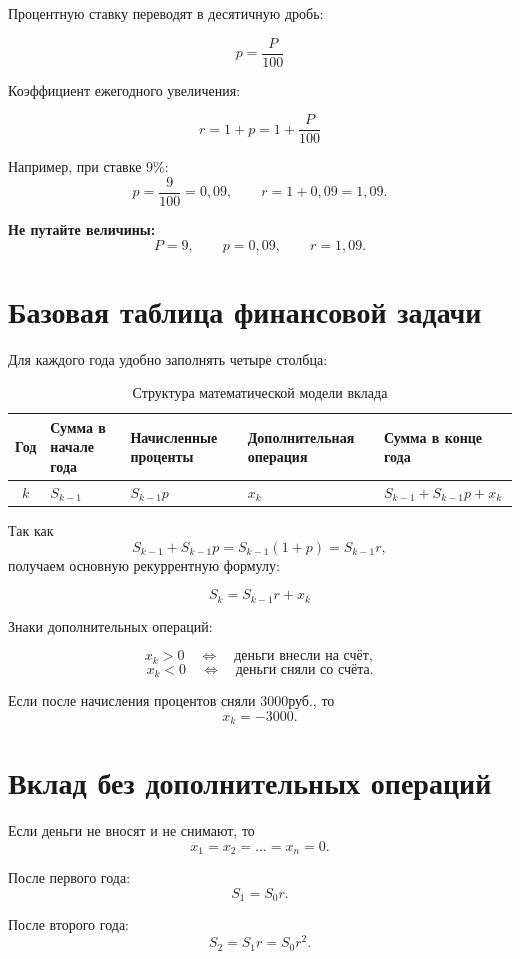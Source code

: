 \documentclass[a4paper,12pt]{article}
\newcommand{\RUB}{\text{руб.}}
\newcommand{\important}[1]{\textbf{\color{darkaccent}#1}}
\newcommand{\formula}[1]{%
  \[
    \boxed{\displaystyle #1}
  \]
}
\begin{document}
Процентную ставку переводят в десятичную дробь:

\formula{p=\frac{P}{100}}

Коэффициент ежегодного увеличения:

\formula{r=1+p=1+\frac{P}{100}}

Например, при ставке \(9\%\):
\[
p=\frac{9}{100}=0{,}09,
\qquad
r=1+0{,}09=1{,}09.
\]

\important{Не путайте величины:}
\[
P=9,\qquad p=0{,}09,\qquad r=1{,}09.
\]

\section{Базовая таблица финансовой задачи}

Для каждого года удобно заполнять четыре столбца:

\begin{table}[ht]
\centering
\caption{Структура математической модели вклада}
\begin{tabularx}{\linewidth}{@{}cXXXX@{}}
\toprule
Год &
Сумма в начале года &
Начисленные проценты &
Дополнительная операция &
Сумма в конце года \\
\midrule
\(k\) &
\(S_{k-1}\) &
\(S_{k-1}p\) &
\(x_k\) &
\(S_{k-1}+S_{k-1}p+x_k\) \\
\bottomrule
\end{tabularx}
\end{table}

Так как
\[
S_{k-1}+S_{k-1}p
=
S_{k-1}(1+p)
=
S_{k-1}r,
\]
получаем основную рекуррентную формулу:

\formula{S_k=S_{k-1}r+x_k}

Знаки дополнительных операций:

\[
x_k>0
\quad\Longleftrightarrow\quad
\text{деньги внесли на счёт},
\]
\[
x_k<0
\quad\Longleftrightarrow\quad
\text{деньги сняли со счёта}.
\]

Если после начисления процентов сняли \(3000\RUB\), то
\[
x_k=-3000.
\]

\section{Вклад без дополнительных операций}

Если деньги не вносят и не снимают, то
\[
x_1=x_2=\ldots=x_n=0.
\]

После первого года:
\[
S_1=S_0r.
\]

После второго года:
\[
S_2=S_1r=S_0r^2.
\]
\end{document}
